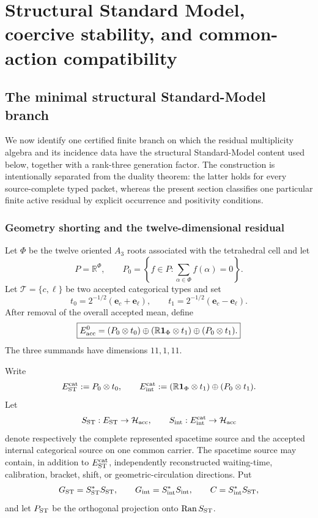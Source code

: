 \documentclass[11pt]{article}
\theoremstyle{definition}
\theoremstyle{remark}
\newcommand{\R}{\mathbb R}
\newcommand{\one}{\mathbf 1}
\newcommand{\Ran}{\operatorname{Ran}}
\newcommand{\Hh}{\mathcal H}
\begin{document}
\section{Structural Standard Model, coercive stability, and common-action compatibility}
\label{sec:structural-stability-action}

\subsection{The minimal structural Standard-Model branch}
\label{sec:structural-sm}

We now identify one certified finite branch on which the residual multiplicity
algebra and its incidence data have the structural Standard-Model content used
below, together with a rank-three generation factor.  The construction is
intentionally separated from the duality theorem: the latter holds for every
source-complete typed packet, whereas the present section classifies one
particular finite active residual by explicit occurrence and positivity
conditions.

\subsubsection{Geometry shorting and the twelve-dimensional residual}

Let $\Phi$ be the twelve oriented $A_3$ roots associated with the tetrahedral
cell and let
\[
P=\R^\Phi,
\qquad
P_0=\left\{f\in P:\sum_{\alpha\in\Phi}f(\alpha)=0\right\}.
\]
Let $\mathscr T=\{c,\ell\}$ be two accepted categorical types and set
\[
t_0=2^{-1/2}(\mathbf e_c+\mathbf e_\ell),
\qquad
t_1=2^{-1/2}(\mathbf e_c-\mathbf e_\ell).
\]
After removal of the overall accepted mean, define
\begin{equation}
\boxed{
E_{\rm acc}^0
=
(P_0\otimes t_0)
\oplus
(\R\one_\Phi\otimes t_1)
\oplus
(P_0\otimes t_1).}
\label{eq:accepted-residual}
\end{equation}
The three summands have dimensions $11,1,11$.

Write
\[
E_{\rm ST}^{\rm cat}:=P_0\otimes t_0,
\qquad
E_{\rm int}^{\rm cat}
:=(\R\one_\Phi\otimes t_1)\oplus(P_0\otimes t_1).
\]
Let
\[
S_{\rm ST}:E_{\rm ST}\to\Hh_{\rm acc},
\qquad
S_{\rm int}:E_{\rm int}^{\rm cat}\to\Hh_{\rm acc}
\]
denote respectively the complete represented spacetime source and the accepted
internal categorical source on one common carrier.  The spacetime source may
contain, in addition to $E_{\rm ST}^{\rm cat}$, independently reconstructed
waiting-time, calibration, bracket, shift, or geometric-circulation directions.
Put
\[
G_{\rm ST}=S_{\rm ST}^*S_{\rm ST},
\qquad
G_{\rm int}=S_{\rm int}^*S_{\rm int},
\qquad
C=S_{\rm int}^*S_{\rm ST},
\]
and let $P_{\rm ST}$ be the orthogonal projection onto $\Ran S_{\rm ST}$.
\end{document}
